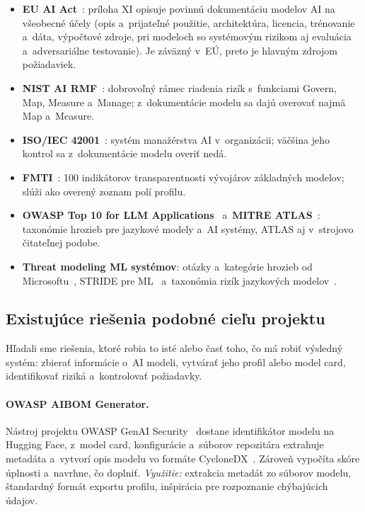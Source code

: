 \begin{itemize}
    \item \textbf{EU AI Act}~\cite{euaiact2024}: príloha XI opisuje povinnú
    dokumentáciu modelov AI na všeobecné účely (opis a~prijateľné použitie,
    architektúra, licencia, trénovanie a~dáta, výpočtové zdroje, pri
    modeloch so systémovým rizikom aj evaluácia a~adversariálne testovanie).
    Je záväzný v~EÚ, preto je hlavným zdrojom požiadaviek.
    \item \textbf{NIST AI RMF}~\cite{nist2023airmf,nist-playbook}: dobrovoľný
    rámec riadenia rizík s~funkciami Govern, Map, Measure a~Manage;
    z~dokumentácie modelu sa dajú overovať najmä Map a~Measure.
    \item \textbf{ISO/IEC 42001}~\cite{iso42001}: systém manažérstva AI
    v~organizácii; väčšina jeho kontrol sa z~dokumentácie modelu overiť nedá.
    \item \textbf{FMTI}~\cite{wan2025}: 100 indikátorov transparentnosti
    vývojárov základných modelov; slúži ako overený zoznam polí profilu.
    \item \textbf{OWASP Top 10 for LLM Applications}~\cite{owasp-llm2025}
    a~\textbf{MITRE ATLAS}~\cite{mitre-atlas}: taxonómie hrozieb pre
    jazykové modely a~AI systémy, ATLAS aj v~strojovo čitateľnej podobe.
    \item \textbf{Threat modeling ML systémov}: otázky a~kategórie hrozieb od
    Microsoftu~\cite{microsoft-aiml-tm}, STRIDE pre ML~\cite{mauri2022}
    a~taxonómia rizík jazykových modelov~\cite{weidinger2022}.
\end{itemize}

\subsection{Existujúce riešenia podobné cieľu projektu}
\label{sec:podobne}

Hľadali sme riešenia, ktoré robia to isté alebo časť toho, čo má robiť
výsledný systém: zbierať informácie o~AI modeli, vytvárať jeho profil
alebo model card, identifikovať riziká a~kontrolovať požiadavky.

\paragraph{OWASP AIBOM Generator.} Nástroj projektu OWASP GenAI
Security~\cite{aibom-generator} dostane identifikátor modelu na Hugging
Face, z~model card, konfigurácie a~súborov repozitára extrahuje metadáta
a~vytvorí opis modelu vo formáte CycloneDX~\cite{cyclonedx-mlbom}. Zároveň
vypočíta skóre úplnosti a~navrhne, čo doplniť. \emph{Využitie:} extrakcia
metadát zo súborov modelu, štandardný formát exportu profilu, inšpirácia
pre rozpoznanie chýbajúcich údajov.

